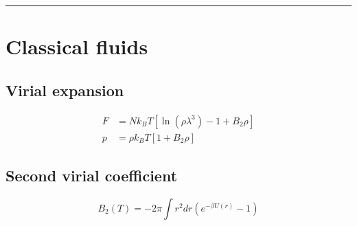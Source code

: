\noindent\rule[1ex]{\textwidth/5}{1pt}
\section{Classical fluids}

\subsection*{Virial expansion}

\[
    \begin{aligned}
        F &= N k_B T \left[\ln(\rho \lambda^3)-1+B_2\rho\right] \\
        p &= \rho k_B T \left[1 + B_2 \rho\right]
    \end{aligned}
\]

\subsection*{Second virial coefficient}

\[
    B_2(T) = -2 \pi \int r^2 dr \left(e^{-\beta U(r)} -1\right)
\]